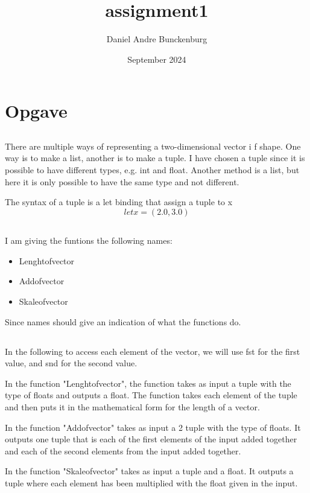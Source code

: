\documentclass{article}
\title{assignment1}
\author{Daniel Andre Bunckenburg}
\date{September 2024}
\begin{document}
\section{Opgave}
\subsection{}

There are multiple ways of representing a two-dimensional vector i f shape. One way is to make a list, another is to make a tuple. I have chosen a tuple since it is possible to have different types, e.g. int and float. Another method is a list, but here it is only possible to have the same type and not different. 

The syntax of a tuple is a let binding that assign a tuple to x $$ let x = (2.0, 3.0)$$



\subsection{}
I am giving the funtions the following names:

\begin{itemize}
  \item Lenghtofvector
  \item Addofvector
  \item Skaleofvector
\end{itemize}
Since names should give an indication of what the functions do. 

\subsection{}

In the following to access each element of the vector, we will use fst for the first value, and snd for the second value.

In the function "Lenghtofvector", the function takes as input a tuple with the type of floats and outputs a float. The function takes each element of the tuple and then puts it in the mathematical form for the length of a vector.

In the function "Addofvector" takes as input a 2 tuple with the type of floats. It outputs one tuple that is each of the first elements of the input added together and each of the second elements from the input added together.

In the function "Skaleofvector" takes as input a tuple and a float. It outputs a tuple where each element has been multiplied with the float given in the input.
\end{document}
